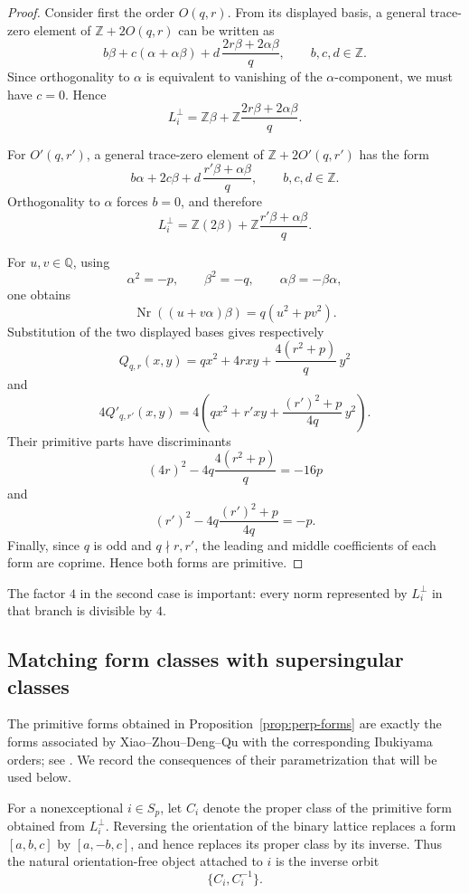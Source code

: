 \documentclass[11pt]{amsart}
\theoremstyle{definition}
\theoremstyle{remark}
\newcommand{\Q}{\mathbb{Q}}
\newcommand{\Z}{\mathbb{Z}}
\newcommand{\Nr}{\operatorname{Nr}}
\begin{document}
\begin{proof}
Consider first the order $O(q,r)$.  From its displayed basis, a general
trace-zero element of $\Z+2O(q,r)$ can be written as
\[
  b\beta+c(\alpha+\alpha\beta)
  +d\,\frac{2r\beta+2\alpha\beta}{q},
  \qquad b,c,d\in\Z.
\]
Since orthogonality to $\alpha$ is equivalent to vanishing of the
$\alpha$-component, we must have $c=0$.  Hence
\[
  L_i^\perp
  =\Z\beta+
   \Z\frac{2r\beta+2\alpha\beta}{q}.
\]

For $O'(q,r')$, a general trace-zero element of $\Z+2O'(q,r')$ has the form
\[
  b\alpha+2c\beta
  +d\,\frac{r'\beta+\alpha\beta}{q},
  \qquad b,c,d\in\Z.
\]
Orthogonality to $\alpha$ forces $b=0$, and therefore
\[
  L_i^\perp
  =\Z(2\beta)+
   \Z\frac{r'\beta+\alpha\beta}{q}.
\]

For $u,v\in\Q$, using
\[
  \alpha^2=-p,\qquad
  \beta^2=-q,\qquad
  \alpha\beta=-\beta\alpha,
\]
one obtains
\[
  \Nr((u+v\alpha)\beta)=q(u^2+pv^2).
\]
Substitution of the two displayed bases gives respectively
\[
  Q_{q,r}(x,y)
  =qx^2+4rxy+\frac{4(r^2+p)}q\,y^2
\]
and
\[
  4Q'_{q,r'}(x,y)
  =4\left(
      qx^2+r'xy+\frac{(r')^2+p}{4q}\,y^2
    \right).
\]
Their primitive parts have discriminants
\[
  (4r)^2-4q\frac{4(r^2+p)}q=-16p
\]
and
\[
  (r')^2-4q\frac{(r')^2+p}{4q}=-p.
\]
Finally, since $q$ is odd and $q\nmid r,r'$, the leading and middle
coefficients of each form are coprime. Hence both forms are primitive.
\end{proof}

The factor $4$ in the second case is important: every norm represented by $L_i^\perp$ in that branch is divisible by $4$.



\subsection{Matching form classes with supersingular classes}

The primitive forms obtained in Proposition~\ref{prop:perp-forms} are
exactly the forms associated by Xiao--Zhou--Deng--Qu with the corresponding
Ibukiyama orders; see
\cite[Section~3, especially Theorems~3.3 and~3.5]{XZDQ2025}.
We record the consequences of their parametrization that will be used
below.

For a nonexceptional $i\in S_p$, let $C_i$ denote the proper class of the
primitive form obtained from $L_i^\perp$. Reversing the orientation of the
binary lattice replaces a form $[a,b,c]$ by $[a,-b,c]$, and hence replaces
its proper class by its inverse. Thus the natural orientation-free object
attached to $i$ is the inverse orbit
\[
  \{C_i,C_i^{-1}\}.
\]
\end{document}

